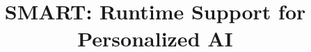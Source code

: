 \documentclass[conference]{IEEEtran}
\title{SMART: Runtime Support for Personalized AI}
\author{\IEEEauthorblockN{Boyuan Feng}
\IEEEauthorblockA{boyuan@cs.ucsb.edu}
\and
\IEEEauthorblockN{Kun Wan}
\IEEEauthorblockA{kun@cs.ucsb.edu}
\and
\IEEEauthorblockN{Yufei Ding}
\IEEEauthorblockA{yufeiding@cs.ucsb.edu}
}
\begin{document}
\begin{spacing}{0.9}
%





%





\end{spacing}
\end{document}
